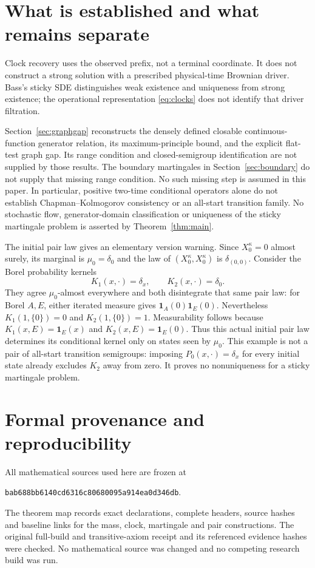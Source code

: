 \documentclass[11pt]{article}
\newcommand{\ind}{\mathbf1}
\newcommand{\code}[1]{\texttt{\small #1}}
\begin{document}
\section{What is established and what remains separate}
Clock recovery uses the observed prefix, not a terminal coordinate.
It does not construct a strong solution with a prescribed physical-time
Brownian driver. Bass's sticky SDE \cite{Bass} distinguishes weak
existence and uniqueness from strong existence; the operational
representation \eqref{eq:clocks} does not identify that driver filtration.

Section~\ref{sec:graphgap} reconstructs the densely defined closable
continuous-function generator relation, its maximum-principle bound,
and the explicit flat-test graph gap. Its range condition and closed-semigroup identification are
not supplied by those results. The boundary martingales in
Section~\ref{sec:boundary} do not supply that missing range condition.
No such missing step is assumed in
this paper. In particular, positive two-time conditional operators
alone do not establish Chapman--Kolmogorov consistency or an
all-start transition family. No stochastic flow, generator-domain
classification or uniqueness of the sticky martingale problem is
asserted by Theorem~\ref{thm:main}.


The initial pair law gives an elementary version warning. Since
$X_0^\kappa=0$ almost surely, its marginal is $\mu_0=\delta_0$
and the law of $(X_0^\kappa,X_0^\kappa)$ is $\delta_{(0,0)}$.
Consider the Borel probability kernels
\[
 K_1(x,\cdot)=\delta_x,\qquad K_2(x,\cdot)=\delta_0.
\]
They agree $\mu_0$-almost everywhere and both disintegrate that
same pair law: for Borel $A,E$, either iterated measure gives
$\ind_A(0)\ind_E(0)$. Nevertheless
$K_1(1,\{0\})=0$ and $K_2(1,\{0\})=1$. Measurability follows
because $K_1(x,E)=\ind_E(x)$ and $K_2(x,E)=\ind_E(0)$.
Thus this actual initial pair law determines its conditional kernel
only on states seen by $\mu_0$. This example is not a pair of
all-start transition semigroups: imposing $P_0(x,\cdot)=\delta_x$
for every initial state already excludes $K_2$ away from zero.
It proves no nonuniqueness for a sticky martingale problem.

\section{Formal provenance and reproducibility}
All mathematical sources used here are frozen at
\begin{center}\code{bab688bb6140cd6316c80680095a914ea0d346db}.\end{center}
The theorem map records exact declarations, complete headers, source
hashes and baseline links for the mass, clock, martingale and pair
constructions. The original full-build and transitive-axiom receipt
and its referenced evidence hashes were checked. No mathematical
source was changed and no competing research build was run.
\end{document}
